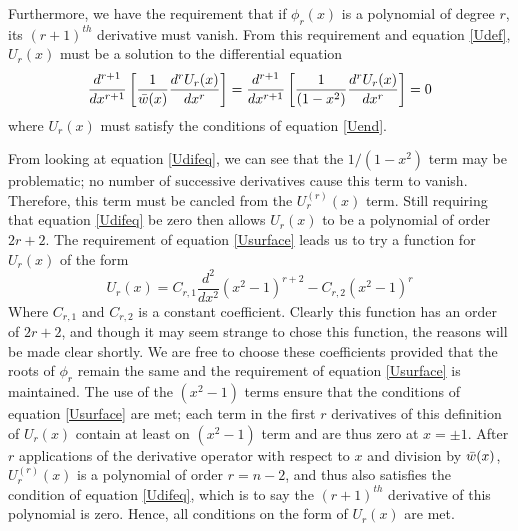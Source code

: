 Furthermore, we have the requirement that if $\phi_r(x)$ is a polynomial of
degree $r$, its $(r+1)^{th}$ derivative must vanish. From this requirement 
and equation \ref{Udef}, $U_r(x)$ must be a solution to the differential equation
\begin{equation}
\label{Udifeq}
\frac{d^{r+1}}{dx^{r+1}}\left[\frac{1}{\bar{w}(x)}\frac{d^rU_r(x)}{dx^r}\right]=
\frac{d^{r+1}}{dx^{r+1}}\left[\frac{1}{(1-x^2)}\frac{d^rU_r(x)}{dx^r}\right]=0
\end{equation}
where $U_r(x)$ must satisfy the conditions of equation \ref{Uend}. 

From looking at equation \ref{Udifeq}, we can see that the $1/(1-x^2)$ term may
be problematic; no number of successive derivatives cause this term to vanish. 
Therefore, this term must be cancled from the $U_r^{(r)}(x)$ term. Still requiring 
that equation \ref{Udifeq} be zero then allows $U_r(x)$ to be a polynomial of order
$2r+2$. The requirement of equation \ref{Usurface} leads us to try a function for $U_r(x)$
of the form
\begin{equation}
\label{U1}
U_r(x)=C_{r,1}\frac{d^2}{dx^2}(x^2-1)^{r+2}-C_{r,2}(x^2-1)^r
\end{equation}
Where $C_{r,1}$ and $C_{r,2}$ is a constant coefficient. 
Clearly this function has an order of $2r+2$, and though it may seem strange to chose 
this function, the reasons will be made clear shortly. We are free to choose these
coefficients provided that the roots of $\phi_r$ remain the same and the requirement
of equation \ref{Usurface} is maintained. The use of the $(x^2-1)$ terms ensure that 
the conditions of equation \ref{Usurface} are met; each term in the first $r$ derivatives
of this definition of $U_r(x)$ contain at least on $(x^2-1)$ term and are thus zero at
$x=\pm1$.  After $r$ applications of the derivative operator with respect to $x$ and
division by $\bar{w}(x)$, 
$U_r^{(r)}(x)$ is a polynomial of order $r=n-2$, and thus also satisfies the condition 
of equation \ref{Udifeq}, which is to say the $(r+1)^{th}$ derivative of this polynomial
is zero. Hence, all conditions on the form of $U_r(x)$ are met. 

